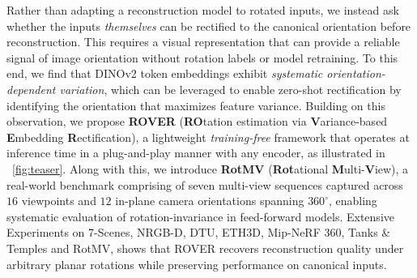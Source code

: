 Rather than adapting a reconstruction model to rotated inputs, we instead ask whether the inputs \textit{themselves} can be rectified to the canonical orientation before reconstruction.
This requires a visual representation that can provide a reliable signal of image orientation without rotation labels or model retraining. To this end, we find that DINOv2 token embeddings exhibit \textit{systematic orientation-dependent variation}, which can be leveraged to enable zero-shot rectification by identifying the orientation that maximizes feature variance. Building on this observation, we propose \textbf{ROVER} (\textbf{RO}tation estimation via \textbf{V}ariance-based \textbf{E}mbedding \textbf{R}ectification), a lightweight \textit{training-free} framework that operates at inference time in a plug-and-play manner with any encoder, as illustrated in ~\cref{fig:teaser}.
Along with this, we introduce \textbf{RotMV} (\textbf{Rot}ational \textbf{M}ulti-\textbf{V}iew), a real-world benchmark comprising of seven multi-view sequences captured across $16$ viewpoints and $12$ in-plane camera orientations spanning $360^\circ$, enabling systematic evaluation of rotation-invariance in feed-forward models.
Extensive Experiments on 7-Scenes, NRGB-D, DTU, ETH3D, Mip-NeRF 360, Tanks \& Temples and RotMV, shows that ROVER recovers reconstruction quality under arbitrary planar rotations while preserving performance on canonical inputs.
